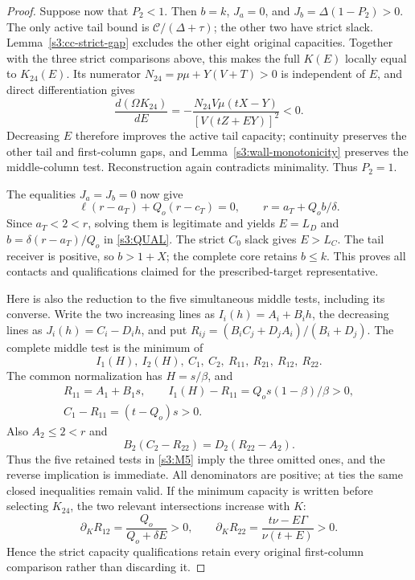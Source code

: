 \documentclass[11pt,reqno]{amsart}
\theoremstyle{definition}
\theoremstyle{remark}
\begin{document}
\begin{proof}
Suppose now that \(P_2<1\). Then \(b=k\), \(J_a=0\), and
\(J_b=\Delta(1-P_2)>0\). The only active tail bound is
\(\mathcal C/(\Delta+\tau)\); the other two have strict slack.
Lemma~\ref{s3:cc-strict-gap} excludes the other eight original
capacities. Together with the three strict comparisons above, this
makes the full \(K(E)\) locally equal to \(K_{24}(E)\).
Its numerator \(N_{24}=p\mu+Y(V+T)>0\) is independent of \(E\),
and direct differentiation gives
\[
 \frac{d(\Omega K_{24})}{dE}
 =-\frac{N_{24}V\mu(tX-Y)}{[V(tZ+EY)]^2}<0.
\]
Decreasing \(E\) therefore improves the active tail capacity;
continuity preserves the other tail and first-column gaps, and
Lemma~\ref{s3:wall-monotonicity} preserves the middle-column test.
Reconstruction again contradicts minimality. Thus \(P_2=1\).

The equalities \(J_a=J_b=0\) now give
\[
 \ell(r-a_T)+Q_o(r-c_T)=0,\qquad
 r=a_T+Q_ob/\delta.
\]
Since \(a_T<2<r\), solving them is legitimate and yields
\(E=L_D\) and \(b=\delta(r-a_T)/Q_o\) in
\eqref{s3:QUAL}. The strict \(C_0\) slack gives \(E>L_C\).
The tail receiver is positive, so \(b>1+X\); the complete core
retains \(b\le k\). This proves all contacts and qualifications
claimed for the prescribed-target representative.

Here is also the reduction to the five simultaneous middle tests,
including its converse. Write the two increasing lines as
\(I_i(h)=A_i+B_i h\), the decreasing lines as
\(J_i(h)=C_i-D_i h\), and put
\(R_{ij}=(B_iC_j+D_jA_i)/(B_i+D_j)\).
The complete middle test is the minimum of
\[
 I_1(H),\ I_2(H),\ C_1,\ C_2,\ R_{11},\ R_{21},\ R_{12},\ R_{22}.
\]
The common normalization has \(H=s/\beta\), and
\[
 \begin{gathered} R_{11}=A_1+B_1s,\qquad I_1(H)-R_{11}=Q_os(1-\beta)/\beta>0,\\
 C_1-R_{11}=(t-Q_o)s>0.\end{gathered}
\]
Also \(A_2\le2<r\) and
\[
 B_2(C_2-R_{22})=D_2(R_{22}-A_2).
\]
Thus the five retained tests in \eqref{s3:M5} imply the three
omitted ones, and the reverse implication is immediate.
All denominators are positive; at ties the same closed inequalities
remain valid. If the minimum capacity is written before selecting
\(K_{24}\), the two relevant intersections increase with \(K\):
\[
 \partial_K R_{12}=\frac{Q_o}{Q_o+\delta E}>0,
 \qquad
 \partial_K R_{22}=\frac{t\nu-E\Gamma}{\nu(t+E)}>0.
\]
Hence the strict capacity qualifications retain every original
first-column comparison rather than discarding it.


\end{proof}
\end{document}
